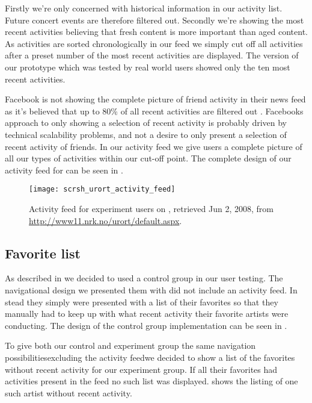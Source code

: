 Firstly we're only concerned with historical information in our activity list.
Future concert events are therefore filtered out. Secondly we're showing the
most recent activities believing that fresh content is more important than
aged content. As activities are sorted chronologically in our feed we simply
cut off all activities after a preset number of the most recent activities are
displayed. The version of our prototype which was tested by real world users
showed only the ten most recent activities.

Facebook is not showing the complete picture of friend activity in their news
feed as it's believed that up to 80\% of all recent activities are filtered
out \citep{elliott08}.
Facebooks approach to only showing a selection of recent activity is
probably driven by technical scalability problems, and not a desire to only
present a selection of recent activity of friends. In our activity feed we
give users a complete picture of all our types of activities within our
cut-off point.
The complete design of our activity feed for \urort{} can be seen in
.

\begin{figure}
  \texttt{[image: scrsh\_urort\_activity\_feed]}
  \caption[\urort{} Activity Feed]{
    Activity feed for experiment users on \urort{},
    retrieved Jun 2, 2008, from
    \url{http://www11.nrk.no/urort/default.aspx}.
  }
  \label{figure:scrsh.urort.activity.feed}
\end{figure}

\subsection{Favorite list}
\label{section:implementation.design.favorite.list}

As described in
we decided to used a control group in our user testing. The navigational
design we presented them with did not include an activity feed. In stead they
simply were presented with a list of their favorites so that they manually had
to keep up with what recent activity their favorite artists were conducting.
The design of the control group implementation can be seen in
.

To give both our control and experiment group the same navigation
possibilities\dash{}excluding the activity feed\dash{}we decided to show a
list of the favorites without recent activity for our experiment group. If all
their favorites had activities present in the feed no such list was displayed.
 shows the listing of one such artist
without recent activity.

